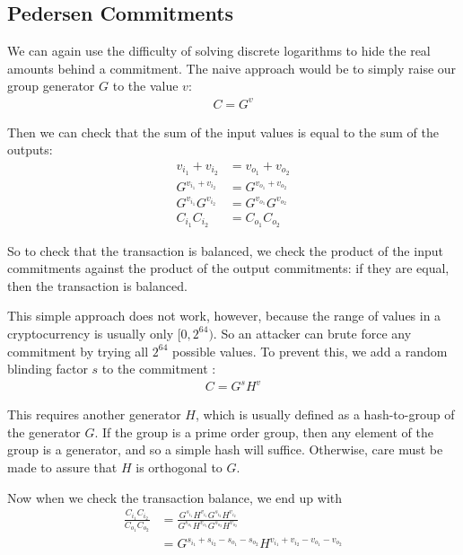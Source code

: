 \documentclass{article}
\begin{document}
\subsection{Pedersen Commitments}

We can again use the difficulty of solving discrete logarithms to hide the real amounts behind a commitment.  The naive approach would be to simply raise our group generator $G$ to the value $v$:
\begin{align}
  C=G^v
\end{align}

Then we can check that the sum of the input values is equal to the sum of the outputs:
\begin{align}
  v_{i_1} + v_{i_2} &= v_{o_1} + v_{o_2}\\
  G^{v_{i_1} + v_{i_2}} &= G^{v_{o_1} + v_{o_2}}\\
  G^{v_{i_1}} G^{v_{i_2}} &= G^{v_{o_1}} G^{v_{o_2}}\\
  C_{i_1} C_{i_2} &= C_{o_1} C_{o_2}
\end{align}
  
So to check that the transaction is balanced, we check the product of the input commitments against the product of the output commitments: if they are equal, then the transaction is balanced.

This simple approach does not work, however, because the range of values in a cryptocurrency is usually only $[0, 2^{64})$.  So an attacker can brute force any commitment by trying all $2^{64}$ possible values.  To prevent this, we add a random blinding factor $s$ to the commitment \cite{ringct}:
\begin{align}
  C = G^s H^v
\end{align}
  
This requires another generator $H$, which is usually defined as a hash-to-group of the generator $G$.  If the group is a prime order group, then any element of the group is a generator, and so a simple hash will suffice.  Otherwise, care must be made to assure that $H$ is orthogonal to $G$.

Now when we check the transaction balance, we end up with
\begin{align}
  \frac{C_{i_1} C_{i_2}}{C_{o_1} C_{o_2}} &= \frac{G^{s_{i_1}} H^{v_{i_1}} G^{s_{i_2}} H^{v_{i_2}}}{G^{s_{o_1}} H^{v_{o_1}} G^{s_{o_2}} H^{v_{o_2}}}\\
                                          &= G^{s_{i_1} + s_{i_2} - s_{o_1} - s_{o_2}} H^{v_{i_1} + v_{i_2} - v_{o_1} - v_{o_2}}
\end{align}
\end{document}
